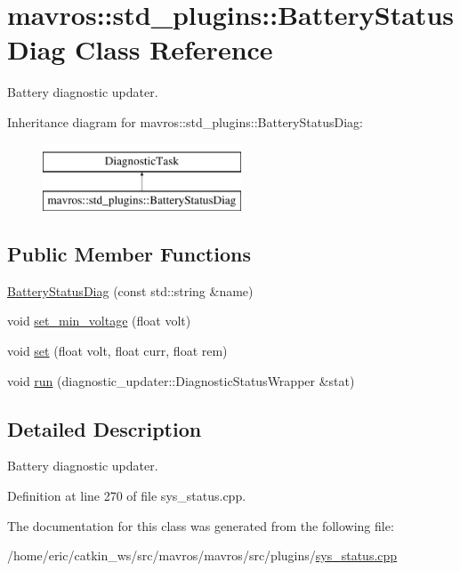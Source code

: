 \hypertarget{classmavros_1_1std__plugins_1_1BatteryStatusDiag}{}\section{mavros\+::std\+\_\+plugins\+::Battery\+Status\+Diag Class Reference}
\label{classmavros_1_1std__plugins_1_1BatteryStatusDiag}


Battery diagnostic updater.  


Inheritance diagram for mavros\+::std\+\_\+plugins\+::Battery\+Status\+Diag\+:\begin{figure}[H]
\begin{center}
\leavevmode
\includegraphics[height=2.000000cm]{classmavros_1_1std__plugins_1_1BatteryStatusDiag}
\end{center}
\end{figure}
\subsection*{Public Member Functions}
\begin{DoxyCompactItemize}
\item 
\mbox{\hyperlink{group__plugin_ga358227b10fadcdf347eed8f7a8dc5019}{Battery\+Status\+Diag}} (const std\+::string \&name)
\item 
void \mbox{\hyperlink{group__plugin_ga14df10d83c18abee5b5d9e4fd14d67d0}{set\+\_\+min\+\_\+voltage}} (float volt)
\item 
void \mbox{\hyperlink{group__plugin_ga09ec2111cd2db38d3c68c2f0263dfc00}{set}} (float volt, float curr, float rem)
\item 
void \mbox{\hyperlink{group__plugin_ga7db23723842e4a269592a178d8ab06ef}{run}} (diagnostic\+\_\+updater\+::\+Diagnostic\+Status\+Wrapper \&stat)
\end{DoxyCompactItemize}


\subsection{Detailed Description}
Battery diagnostic updater. 

Definition at line 270 of file sys\+\_\+status.\+cpp.



The documentation for this class was generated from the following file\+:\begin{DoxyCompactItemize}
\item 
/home/eric/catkin\+\_\+ws/src/mavros/mavros/src/plugins/\mbox{\hyperlink{sys__status_8cpp}{sys\+\_\+status.\+cpp}}\end{DoxyCompactItemize}

